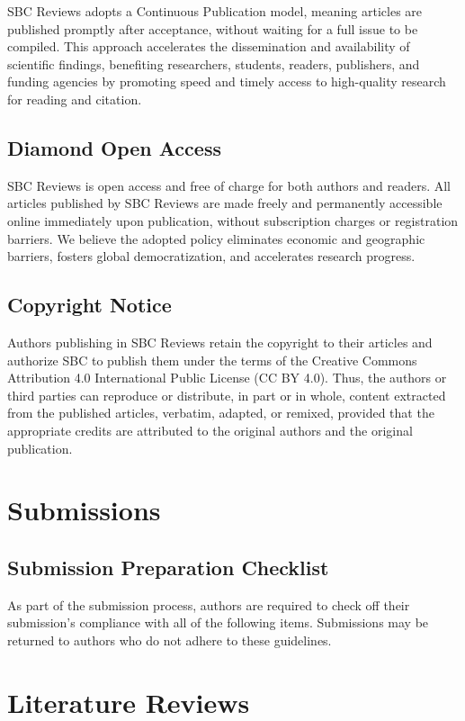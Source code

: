 \documentclass[english]{sbcreviews-2025}%
\begin{document}
SBC Reviews adopts a Continuous Publication model, meaning articles are published promptly after acceptance, without waiting for a full issue to be compiled. This approach accelerates the dissemination and availability of scientific findings, benefiting researchers, students, readers, publishers, and funding agencies by promoting speed and timely access to high-quality research for reading and citation.

\subsection{Diamond Open Access}

SBC Reviews is open access and free of charge for both authors and readers. All articles published by SBC Reviews are made freely and permanently accessible online immediately upon publication, without subscription charges or registration barriers. We believe the adopted policy eliminates economic and geographic barriers, fosters global democratization, and accelerates research progress. 

\subsection{Copyright Notice}
Authors publishing in SBC Reviews retain the copyright to their articles and authorize SBC to publish them under the terms of the Creative Commons Attribution 4.0 International Public License (CC BY 4.0). Thus, the authors or third parties can reproduce or distribute, in part or in whole, content extracted from the published articles, verbatim, adapted, or remixed, provided that the appropriate credits are attributed to the original authors and the original publication.

\section{Submissions}

\subsection{Submission Preparation Checklist}
As part of the submission process, authors are required to check off their submission's compliance with all of the following items. Submissions may be returned to authors who do not adhere to these guidelines.


\section{Literature Reviews}
\end{document}
